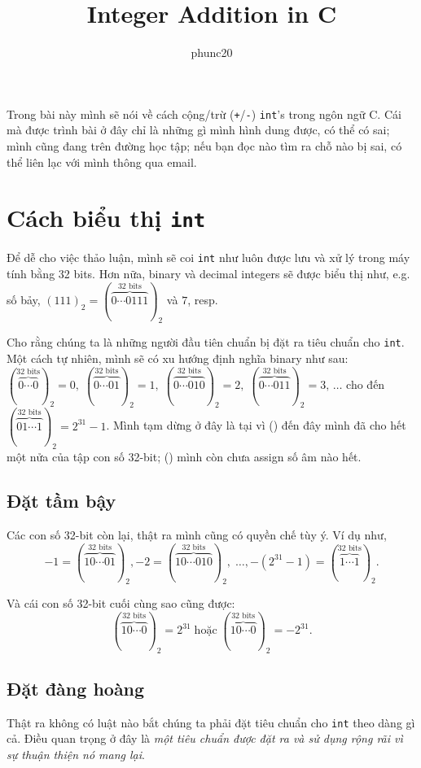 \documentclass{article}
\author{phunc20}
\title{Integer Addition in C}
\begin{document}
\maketitle
Trong bài này mình sẽ nói về cách cộng/trừ (\texttt{+}/\texttt{-}) \texttt{int}'s trong ngôn ngữ C. Cái mà được trình bài ở đây chỉ là những gì mình hình dung được, có thể có sai; mình cũng đang trên đường học tập; nếu bạn đọc nào tìm ra chỗ nào bị sai, có thể liên lạc với mình thông qua email.

\section{Cách biểu thị \texttt{int}}
Để dễ cho việc thảo luận, mình sẽ coi \texttt{int} như luôn được lưu và xử lý trong máy tính bằng 32 bits. Hơn nữa, binary và decimal integers sẽ được biểu thị như, e.g. số bảy, $(111)_{2} = (\overbrace{0\cdots0111}^{\textrm{32 bits}})_{2}$ và $7$, resp.

Cho rằng chúng ta là những người đầu tiên chuẩn bị đặt ra tiêu chuẩn cho \texttt{int}.
Một cách tự nhiên, mình sẽ có xu hướng định nghĩa binary như sau: $(\overbrace{0\cdots0}^{\textrm{32 bits}})_{2} = 0,\; (\overbrace{0\cdots01}^{\textrm{32 bits}})_{2} = 1,\; (\overbrace{0\cdots010}^{\textrm{32 bits}})_{2} = 2,\; (\overbrace{0\cdots011}^{\textrm{32 bits}})_{2} = 3,\, \ldots$ cho đến $(\overbrace{01\cdots1}^{\textrm{32 bits}})_{2} = 2^{31} - 1$. Mình tạm dừng ở đây là tại vì () đến đây mình đã cho hết một nửa của tập con số 32-bit; () mình còn chưa assign số âm nào hết.
\subsection{Đặt tầm bậy}
Các con số 32-bit còn lại, thật ra mình cũng có quyền chế tùy ý. Ví dụ như, 
$$-1 = (\overbrace{10\cdots01}^{\textrm{32 bits}})_{2}, -2 = (\overbrace{10\cdots010}^{\textrm{32 bits}})_{2},\;\ldots, -(2^{31} - 1) = (\overbrace{1\cdots1}^{\textrm{32 bits}})_{2}.$$

Và cái con số 32-bit cuối cùng sao cũng được:
$$(\overbrace{10\cdots0}^{\textrm{32 bits}})_{2} = 2^{31} \;\textrm{hoặc}\; (\overbrace{10\cdots0}^{\textrm{32 bits}})_{2} = -2^{31}.$$

\subsection{Đặt đàng hoàng}
Thật ra không có luật nào bắt chúng ta phải đặt tiêu chuẩn cho \texttt{int} theo dàng gì cả. Điều quan trọng ở đây là \textit{một tiêu chuẩn được đặt ra và sử dụng rộng rãi vì sự thuận thiện nó mang lại}.
\vfil \break
\end{document}
